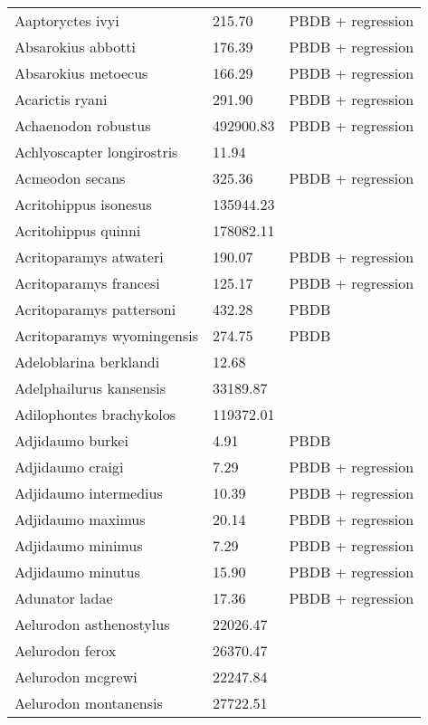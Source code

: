\documentclass{article}
\begin{document}
\begin{center}
\begin{longtable}{p{} p{} p{}}
    \hline \hline
    \endlastfoot
    Aaptoryctes ivyi & 215.70 & PBDB + regression \\ 
    Absarokius abbotti & 176.39 & PBDB + regression \\ 
    Absarokius metoecus & 166.29 & PBDB + regression \\ 
    Acarictis ryani & 291.90 & PBDB + regression \\ 
    Achaenodon robustus & 492900.83 & PBDB + regression \\ 
    Achlyoscapter longirostris & 11.94 & \cite{Tomiya2013} \\ 
    Acmeodon secans & 325.36 & PBDB + regression \\ 
    Acritohippus isonesus & 135944.23 & \cite{Tomiya2013} \\ 
    Acritohippus quinni & 178082.11 & \cite{Tomiya2013} \\ 
    Acritoparamys atwateri & 190.07 & PBDB + regression \\ 
    Acritoparamys francesi & 125.17 & PBDB + regression \\ 
    Acritoparamys pattersoni & 432.28 & PBDB \\ 
    Acritoparamys wyomingensis & 274.75 & PBDB \\ 
    Adeloblarina berklandi & 12.68 & \cite{Tomiya2013} \\ 
    Adelphailurus kansensis & 33189.87 & \cite{Tomiya2013} \\ 
    Adilophontes brachykolos & 119372.01 & \cite{Tomiya2013} \\ 
    Adjidaumo burkei & 4.91 & PBDB \\ 
    Adjidaumo craigi & 7.29 & PBDB + regression \\ 
    Adjidaumo intermedius & 10.39 & PBDB + regression \\ 
    Adjidaumo maximus & 20.14 & PBDB + regression \\ 
    Adjidaumo minimus & 7.29 & PBDB + regression \\ 
    Adjidaumo minutus & 15.90 & PBDB + regression \\ 
    Adunator ladae & 17.36 & PBDB + regression \\ 
    Aelurodon asthenostylus & 22026.47 & \cite{Tomiya2013} \\ 
    Aelurodon ferox & 26370.47 & \cite{Tomiya2013} \\ 
    Aelurodon mcgrewi & 22247.84 & \cite{Tomiya2013} \\ 
    Aelurodon montanensis & 27722.51 & \cite{Tomiya2013} \\ 

\end{longtable}
\end{center}
\end{document}
